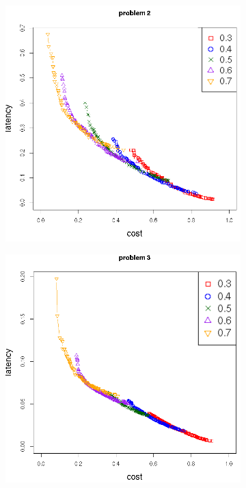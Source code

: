 \begin{figure}[!h]
   \centering
   \begin{subfigure}{0.49\textwidth}
       \includegraphics[width=\textwidth]{pics/static_threshold_problem_2.png}
	   \caption{}
   \end{subfigure}
   \begin{subfigure}{0.49\textwidth}
       \includegraphics[width=\textwidth]{pics/static_threshold_problem_3.png}

\end{subfigure}
\end{figure}
